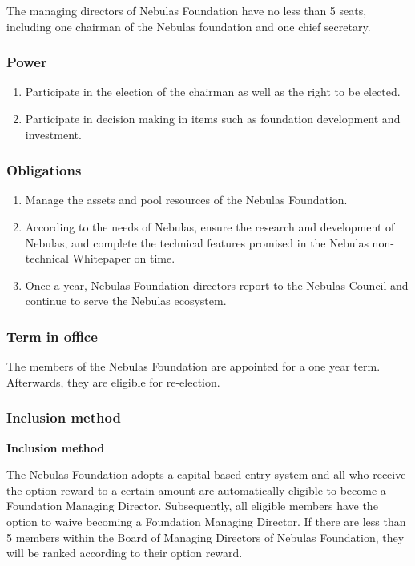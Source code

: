 The managing directors of Nebulas Foundation have no less than 5 seats, including one chairman of the Nebulas foundation and one chief secretary.

\subsubsection{Power}

\begin{enumerate}
	\item Participate in the election of the chairman as well as the right to be elected.
	\item Participate in decision making in items such as foundation development and investment.
\end{enumerate}

\subsubsection{Obligations}

\begin{enumerate}
	\item Manage the assets and pool resources of the Nebulas Foundation.
	\item According to the needs of Nebulas, ensure the research and development of Nebulas, and complete the technical features promised in the Nebulas non-technical Whitepaper on time.
	\item Once a year, Nebulas Foundation directors report to the Nebulas Council and continue to serve the Nebulas ecosystem.
\end{enumerate}

\subsubsection{Term in office}

The members of the Nebulas Foundation are appointed for a one year term. Afterwards, they are eligible for re-election.

\subsubsection{Inclusion method}

\textbf{Inclusion method}

The Nebulas Foundation adopts a capital-based entry system and all who receive the option reward to a certain amount are automatically eligible to become a Foundation Managing Director. Subsequently, all eligible members have the option to waive becoming a Foundation Managing Director. If there are less than 5 members within the Board of Managing Directors of Nebulas Foundation, they will be ranked according to their option reward.

